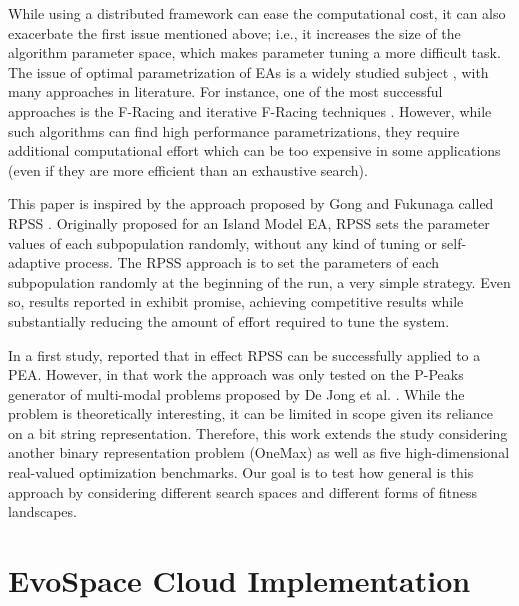 \documentclass[graybox]{svmult}
\begin{document}
While using a distributed framework can ease the computational cost, it can also exacerbate the first issue mentioned above;
i.e., it increases the size of the algorithm parameter space, which makes parameter tuning a more difficult task.
The issue of optimal parametrization of EAs is a widely studied subject \cite{de2007parameter},
with many approaches in literature. For instance, one of the most successful approaches
is the F-Racing and iterative F-Racing techniques \cite{lopez2011irace}.
However, while such algorithms can find high performance parametrizations,
they require additional computational effort which can be too expensive in some applications
(even if they are more efficient than an exhaustive search).

This paper is inspired by the approach proposed by Gong and Fukunaga
called RPSS \cite{fuku1,fuku2}.
Originally proposed for an Island Model EA, RPSS sets the parameter values of each subpopulation randomly,
without any kind of tuning or self-adaptive process. The RPSS approach is to set the parameters
of each subpopulation randomly at the beginning of the run, a very simple strategy.
Even so, results reported in \cite{fuku1,fuku2} exhibit promise, achieving competitive results
while substantially reducing the amount of effort required to tune the system.

In a first study, \cite{garcia2014randomized} reported that in effect RPSS
can be successfully applied to a PEA. However, in that work the
approach was only tested on the P-Peaks generator of multi-modal problems proposed by De Jong et al. \cite{Jong:PS97}.
While the problem is theoretically interesting, it can be limited in scope given its reliance on a bit string representation.
Therefore, this work extends the study considering another binary representation problem (OneMax) as well as
five high-dimensional real-valued optimization benchmarks. Our goal is
to test how general is this approach by considering different search
spaces and different forms of fitness landscapes.


\section{EvoSpace Cloud Implementation}
\label{sec:evo}
\end{document}

